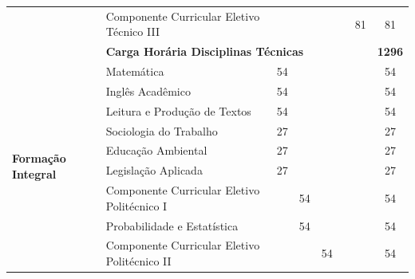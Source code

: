\documentclass[11pt,fleqn]{book} %
\begin{document}
\begin{table}[]
{\begin{tabular}{|l|l|c|c|c|c|c|c|}
				& Componente Curricular Eletivo Técnico III     &                      &                      &                      &                      & 81                   & 81            \\ \cline{2-8} 
				& \multicolumn{6}{l|}{\textbf{Carga Horária Disciplinas Técnicas}}                                                                                                 & \textbf{1296} \\ \hline
				\multirow{17}{*}{\textbf{Formação Integral}}  & Matemática                                    & 54                   &                      &                      &                      &                      & 54            \\ \cline{2-8} 
				& Inglês Acadêmico                              & 54                   &                      &                      &                      &                      & 54            \\ \cline{2-8} 
				& Leitura e Produção de Textos                  & 54                   &                      &                      &                      &                      & 54            \\ \cline{2-8} 
				& Sociologia do Trabalho                        & 27                   &                      &                      &                      &                      & 27            \\ \cline{2-8} 
				& Educação Ambiental                            & 27                   &                      &                      &                      &                      & 27            \\ \cline{2-8} 
				& Legislação Aplicada                           & 27                   &                      &                      &                      &                      & 27            \\ \cline{2-8} 
				& Componente Curricular Eletivo Politécnico I   &                      & 54                   &                      &                      &                      & 54            \\ \cline{2-8} 
				& Probabilidade e Estatística                   &                      & 54                   &                      &                      &                      & 54            \\ \cline{2-8} 
				& Componente Curricular Eletivo Politécnico II  &                      &                      & 54                   &                      &                      & 54            \\ \cline{2-8} 

\end{tabular}}
\end{table}
\end{document}
